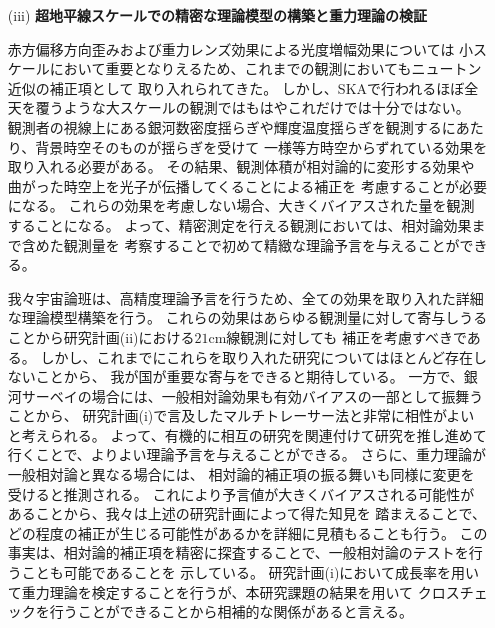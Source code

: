 \begin{enumerate}
\item[(iii)] {\bf 超地平線スケールでの精密な理論模型の構築と重力理論の検証}

赤方偏移方向歪みおよび重力レンズ効果による光度増幅効果については
小スケールにおいて重要となりえるため、これまでの観測においてもニュートン近似の補正項として
取り入れられてきた。
しかし、SKAで行われるほぼ全天を覆うような大スケールの観測ではもはやこれだけでは十分ではない。
観測者の視線上にある銀河数密度揺らぎや輝度温度揺らぎを観測するにあたり、背景時空そのものが揺らぎを受けて
一様等方時空からずれている効果を取り入れる必要がある。
その結果、観測体積が相対論的に変形する効果や曲がった時空上を光子が伝播してくることによる補正を
考慮することが必要になる。
これらの効果を考慮しない場合、大きくバイアスされた量を観測することになる。
よって、精密測定を行える観測においては、相対論効果まで含めた観測量を
考察することで初めて精緻な理論予言を与えることができる。

我々宇宙論班は、高精度理論予言を行うため、全ての効果を取り入れた詳細な理論模型構築を行う。
これらの効果はあらゆる観測量に対して寄与しうることから研究計画(ii)における$21$cm線観測に対しても
補正を考慮すべきである。
しかし、これまでにこれらを取り入れた研究についてはほとんど存在しないことから、
我が国が重要な寄与をできると期待している。
一方で、銀河サーベイの場合には、一般相対論効果も有効バイアスの一部として振舞うことから、
研究計画(i)で言及したマルチトレーサー法と非常に相性がよいと考えられる。
よって、有機的に相互の研究を関連付けて研究を推し進めて行くことで、よりよい理論予言を与えることができる。
さらに、重力理論が一般相対論と異なる場合には、
相対論的補正項の振る舞いも同様に変更を受けると推測される。
これにより予言値が大きくバイアスされる可能性があることから、我々は上述の研究計画によって得た知見を
踏まえることで、どの程度の補正が生じる可能性があるかを詳細に見積もることも行う。
この事実は、相対論的補正項を精密に探査することで、一般相対論のテストを行うことも可能であることを
示している。
研究計画(i)において成長率を用いて重力理論を検定することを行うが、本研究課題の結果を用いて
クロスチェックを行うことができることから相補的な関係があると言える。

\end{enumerate}
